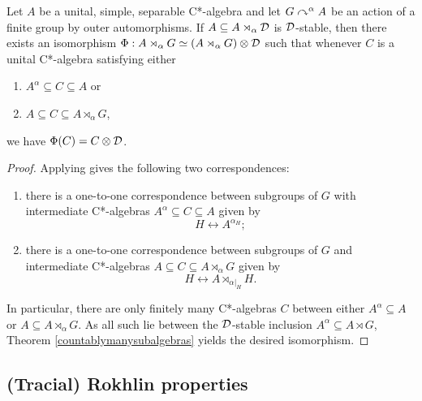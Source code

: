 \documentclass[12pt]{amsart}
\begin{document}
    \begin{theorem}\label{Galois}
        Let $A$ be a unital, simple, separable C*-algebra and let $G \curvearrowright^\alpha A$ be an action of a finite group by outer automorphisms. If $A \subseteq A \rtimes_\alpha \mathcal{D}$ is $\mathcal{D}$-stable, then there exists an isomorphism $\Phi: A \rtimes_\alpha G \simeq (A \rtimes_\alpha G) \otimes \mathcal{D}$ such that whenever $C$ is a unital C*-algebra satisfying either
          \begin{enumerate}
            \item $A^\alpha \subseteq C \subseteq A$ or
            \item $A \subseteq C \subseteq A \rtimes_\alpha G$,
          \end{enumerate}
          we have $\Phi(C) = C \otimes \mathcal{D}$.
            \begin{proof}
              Applying \cite[Corollary 6.6]{Izumi02} gives the following two correspondences:
                \begin{enumerate}
                  \item there is a one-to-one correspondence between subgroups of $G$ with intermediate C*-algebras $A^\alpha \subseteq C \subseteq A$ given by
\begin{equation}
                    H \leftrightarrow A^{\alpha_H};
\end{equation}
                  \item there is a one-to-one correspondence between subgroups of $G$ and intermediate C*-algebras $A \subseteq C \subseteq A \rtimes_\alpha G$ given by
\begin{equation}
                    H \leftrightarrow A \rtimes_{\alpha|_H} H.
\end{equation}
                \end{enumerate}
            In particular, there are only finitely many C*-algebras $C$ between either $A^\alpha \subseteq A$ or $A \subseteq A \rtimes_\alpha G$. As all such lie between the $\mathcal{D}$-stable inclusion $A^ \alpha \subseteq A \rtimes G$, Theorem \ref{countablymanysubalgebras} yields the desired isomorphism. 
            \end{proof}
      \end{theorem}



  \subsection{(Tracial) Rokhlin properties}\label{ssection:dse-tracial-Rokhlin}
\end{document}
